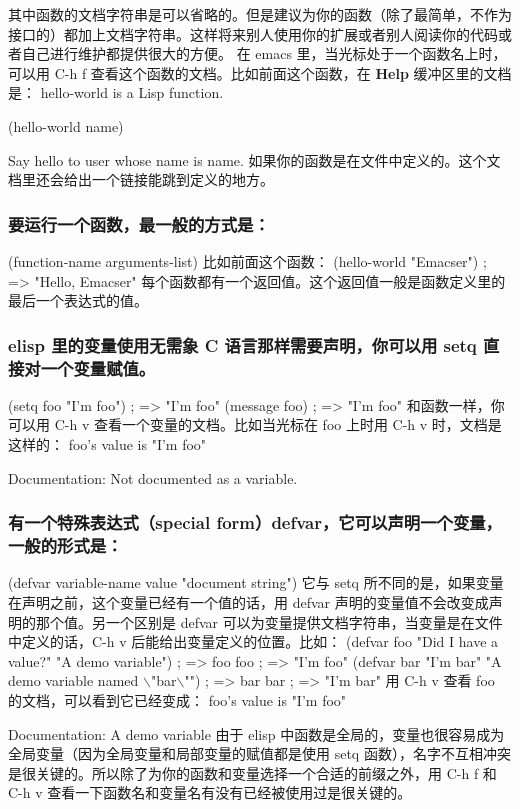 \documentclass[11pt]{ctexart}
\begin{document}
{{{{其中函数的文档字符串是可以省略的。但是建议为你的函数（除了最简单，不作为接口的）都加上文档字符串。这样将来别人使用你的扩展或者别人阅读你的代码或者自己进行维护都提供很大的方便。
在 emacs 里，当光标处于一个函数名上时，可以用 C-h f 查看这个函数的文档。比如前面这个函数，在 \textbf{Help} 缓冲区里的文档是：
hello-world is a Lisp function.
\begin{SCR}
(hello-world name)
\end{SCR}
Say hello to user whose name is name.
如果你的函数是在文件中定义的。这个文档里还会给出一个链接能跳到定义的地方。
\subsubsection{要运行一个函数，最一般的方式是：}
\label{sec:org7cfccfa}
(function-name arguments-list)
比如前面这个函数：
(hello-world "Emacser")                 ; => "Hello, Emacser"
每个函数都有一个返回值。这个返回值一般是函数定义里的最后一个表达式的值。
\subsubsection{elisp 里的变量使用无需象 C 语言那样需要声明，你可以用 setq 直接对一个变量赋值。}
\label{sec:org1541b9a}
(setq foo "I'm foo")                    ; => "I'm foo"
(message foo)                           ; => "I'm foo"
和函数一样，你可以用 C-h v 查看一个变量的文档。比如当光标在 foo 上时用 C-h v 时，文档是这样的：
foo's value is "I'm foo"

Documentation:
Not documented as a variable.
\subsubsection{有一个特殊表达式（special form）defvar，它可以声明一个变量，一般的形式是：}
\label{sec:org65d24af}
(defvar variable-name value
"document string")
它与 setq 所不同的是，如果变量在声明之前，这个变量已经有一个值的话，用 defvar 声明的变量值不会改变成声明的那个值。另一个区别是 defvar 可以为变量提供文档字符串，当变量是在文件中定义的话，C-h v 后能给出变量定义的位置。比如：
(defvar foo "Did I have a value?"
"A demo variable")                    ; => foo
foo                                     ; => "I'm foo"
(defvar bar "I'm bar"
"A demo variable named $\backslash$"bar$\backslash$"")      ; => bar
bar                                     ; => "I'm bar"
用 C-h v 查看 foo 的文档，可以看到它已经变成：
foo's value is "I'm foo"

Documentation:
A demo variable
由于 elisp 中函数是全局的，变量也很容易成为全局变量（因为全局变量和局部变量的赋值都是使用 setq 函数），名字不互相冲突是很关键的。所以除了为你的函数和变量选择一个合适的前缀之外，用 C-h f 和 C-h v 查看一下函数名和变量名有没有已经被使用过是很关键的。
}}}}
\end{document}
